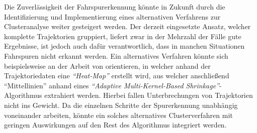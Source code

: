Die Zuverlässigkeit der Fahrspurerkennung könnte in Zukunft durch die Identifizierung und Implementierung
eines alternativen Verfahrens zur Clusteranalyse weiter gesteigert werden.
Der derzeit
eingesetzte Ansatz, welcher komplette Trajektorien gruppiert, liefert zwar in der Mehrzahl der Fälle
gute Ergebnisse, ist jedoch auch dafür verantwortlich, dass in manchen Situationen Fahrspuren nicht erkannt werden.
Ein alternatives Verfahren könnte sich beispielsweise an der Arbeit von \cite[]{Xu2015} orientieren, in welcher
anhand der Trajektoriedaten eine \textit{``Heat-Map''} erstellt wird, aus welcher anschließend ``Mittellinien''
anhand eines \textit{``Adaptive Multi-Kernel-Based Shrinkage''}-Algorithmus extrahiert werden.
Hierbei fallen Unterbrechungen von Trajektorien nicht ins Gewicht.
Da die einzelnen Schritte der Spurerkennung unabhängig voneinander arbeiten, könnte ein
solches alternatives Clusterverfahren mit geringen Auswirkungen auf den Rest des Algorithmus integriert werden.
